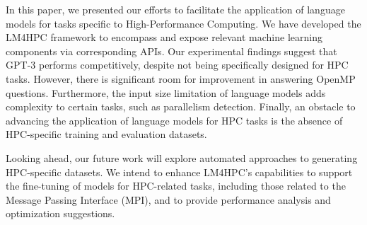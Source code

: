 In this paper, we presented our efforts to facilitate the application of language models for tasks specific to High-Performance Computing. We have developed the LM4HPC framework to encompass and expose relevant machine learning components via corresponding APIs.
Our experimental findings suggest that GPT-3 performs competitively, despite not being specifically designed for HPC tasks. However, there is significant room for improvement in answering OpenMP questions. Furthermore, the input size limitation of language models adds complexity to certain tasks, such as parallelism detection. Finally, an obstacle to advancing the application of language models for HPC tasks is the absence of HPC-specific training and evaluation datasets.

Looking ahead, our future work will explore automated approaches to generating HPC-specific datasets. We intend to enhance LM4HPC's capabilities to support the fine-tuning of models for HPC-related tasks, including those related to the Message Passing Interface (MPI), and to provide performance analysis and optimization suggestions.

